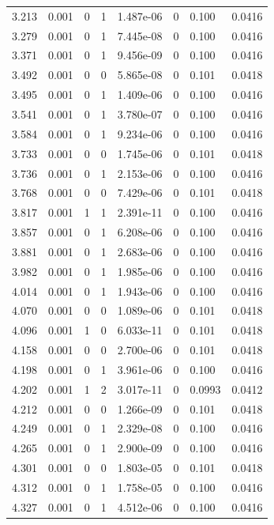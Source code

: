 \documentclass[preview]{standalone}
\begin{document}
{{{\begin{tabular}{L{1.2cm}C{1.2cm} C{0.3cm}C{0.5cm} C{1.4cm}C{1.4cm} C{1.4cm}C{1.4cm}}
  3.213  &  0.001  & 0     &  1 &  1.487e-06  & 0  & 0.100 &  0.0416   \\ 
  3.279  &  0.001  & 0     &  1 &  7.445e-08  & 0  & 0.100 &  0.0416   \\ 
  3.371  &  0.001  & 0     &  1 &  9.456e-09  & 0  & 0.100 &  0.0416   \\ 
  3.492  &  0.001  & 0     &  0 &  5.865e-08  & 0  & 0.101 &  0.0418   \\ 
  3.495  &  0.001  & 0     &  1 &  1.409e-06  & 0  & 0.100 &  0.0416   \\ 
  3.541  &  0.001  & 0     &  1 &  3.780e-07  & 0  & 0.100 &  0.0416   \\ 
  3.584  &  0.001  & 0     &  1 &  9.234e-06  & 0  & 0.100 &  0.0416   \\ 
  3.733  &  0.001  & 0     &  0 &  1.745e-06  & 0  & 0.101 &  0.0418   \\ 
  3.736  &  0.001  & 0     &  1 &  2.153e-06  & 0  & 0.100 &  0.0416   \\ 
  3.768  &  0.001  & 0     &  0 &  7.429e-06  & 0  & 0.101 &  0.0418   \\ 
  3.817  &  0.001  & 1     &  1 &  2.391e-11  & 0  & 0.100 &  0.0416   \\ 
  3.857  &  0.001  & 0     &  1 &  6.208e-06  & 0  & 0.100 &  0.0416   \\ 
  3.881  &  0.001  & 0     &  1 &  2.683e-06  & 0  & 0.100 &  0.0416   \\ 
  3.982  &  0.001  & 0     &  1 &  1.985e-06  & 0  & 0.100 &  0.0416   \\ 
  4.014  &  0.001  & 0     &  1 &  1.943e-06  & 0  & 0.100 &  0.0416   \\ 
  4.070  &  0.001  & 0     &  0 &  1.089e-06  & 0  & 0.101 &  0.0418   \\ 
  4.096  &  0.001  & 1     &  0 &  6.033e-11  & 0  & 0.101 &  0.0418   \\ 
  4.158  &  0.001  & 0     &  0 &  2.700e-06  & 0  & 0.101 &  0.0418   \\ 
  4.198  &  0.001  & 0     &  1 &  3.961e-06  & 0  & 0.100 &  0.0416   \\ 
  4.202  &  0.001  & 1     &  2 &  3.017e-11  & 0  & 0.0993 &  0.0412   \\ 
  4.212  &  0.001  & 0     &  0 &  1.266e-09  & 0  & 0.101 &  0.0418   \\ 
  4.249  &  0.001  & 0     &  1 &  2.329e-08  & 0  & 0.100 &  0.0416   \\ 
  4.265  &  0.001  & 0     &  1 &  2.900e-09  & 0  & 0.100 &  0.0416   \\ 
  4.301  &  0.001  & 0     &  0 &  1.803e-05  & 0  & 0.101 &  0.0418   \\ 
  4.312  &  0.001  & 0     &  1 &  1.758e-05  & 0  & 0.100 &  0.0416   \\ 
  4.327  &  0.001  & 0     &  1 &  4.512e-06  & 0  & 0.100 &  0.0416   \\ 
\hline 
\end{tabular} 

}}}
\end{document}
